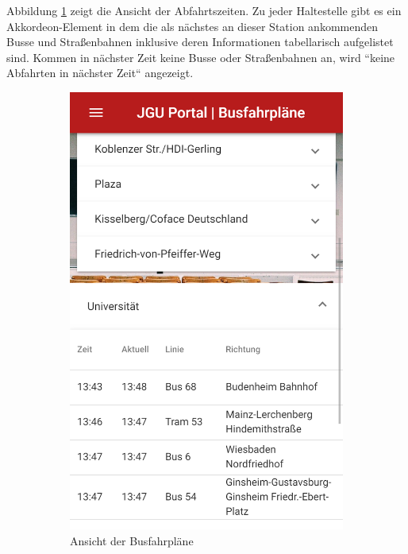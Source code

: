Abbildung \ref{fig:busStops} zeigt die Ansicht der Abfahrtszeiten. Zu jeder Haltestelle gibt es ein Akkordeon-Element in dem die als nächstes an dieser Station ankommenden Busse und Straßenbahnen inklusive deren Informationen tabellarisch aufgelistet sind. Kommen in nächster Zeit keine Busse oder Straßenbahnen an, wird ``keine Abfahrten in nächster Zeit`` angezeigt.

\begin{figure}
\begin{subfigure}{.5\textwidth}
  \centering
  \includegraphics[width=.8\linewidth]{gfx/Busse}
  \caption{Ansicht der Busfahrpläne}
  \label{fig:busStops}
\end{subfigure}%
\begin{subfigure}{.5\textwidth}
  \centering

\end{subfigure}
\end{figure}
